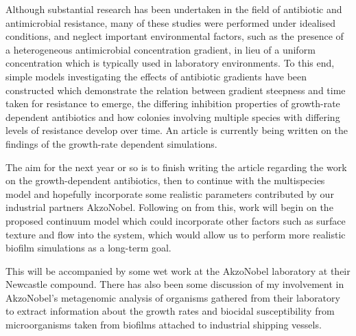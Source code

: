 \documentclass[a4paper,12pt]{article}
\begin{document}
Although substantial research has been undertaken in the field of antibiotic and antimicrobial resistance, many of these studies were performed under idealised conditions, and neglect 
important environmental factors, such as the presence of a heterogeneous antimicrobial concentration gradient, in lieu of a uniform concentration which is typically used in laboratory 
environments.  To this end, simple models investigating the effects of antibiotic gradients have been constructed which demonstrate the relation between gradient steepness and time taken 
for resistance to emerge, the differing inhibition properties of growth-rate dependent antibiotics and how colonies involving multiple species with differing levels of resistance 
develop over time.  An article is currently being written on the findings of the growth-rate dependent simulations.

The aim for the next year or so is to finish writing the article regarding the work on the growth-dependent antibiotics, then to continue with the multispecies
model and hopefully incorporate some realistic parameters contributed by our industrial partners AkzoNobel.  Following on from this, work will begin on the proposed
continuum model which could incorporate other factors such as surface texture and flow into the system, which would allow us to perform more realistic biofilm simulations as a 
long-term goal.  

This will be accompanied by some wet work at the AkzoNobel laboratory
at their Newcastle compound.  There has also been some discussion of
my involvement in AkzoNobel's metagenomic analysis of organisms gathered from their laboratory to extract information about the growth rates and biocidal susceptibility from 
microorganisms taken from biofilms attached to industrial shipping vessels.


\pagebreak
\newpage


\end{document}
